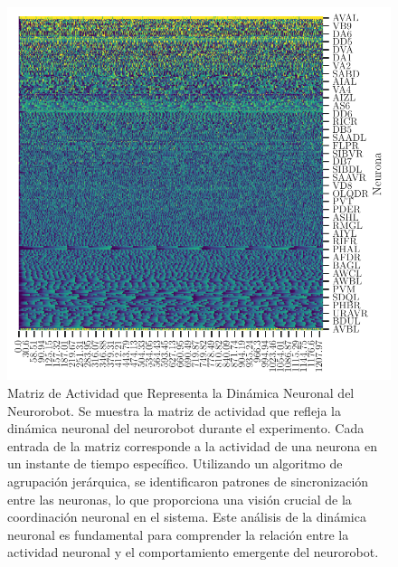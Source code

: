  \begin{figure}[h!]
	\centering\includegraphics[width=\imsize]{clusteres_dinamica.pdf}
	\caption[ Matriz de Actividad que Representa la Dinámica Neuronal del Neurorobot.]{ Matriz de Actividad que Representa la Dinámica Neuronal del Neurorobot. Se muestra la matriz de actividad que refleja la dinámica neuronal del neurorobot durante el experimento. Cada entrada de la matriz corresponde a la actividad de una neurona en un instante de tiempo específico. Utilizando un algoritmo de agrupación jerárquica, se identificaron patrones de sincronización entre las neuronas, lo que proporciona una visión crucial de la coordinación neuronal en el sistema. Este análisis de la dinámica neuronal es fundamental para comprender la relación entre la actividad neuronal y el comportamiento emergente del neurorobot.}\label{fig:matrizrobot}
\end{figure}



